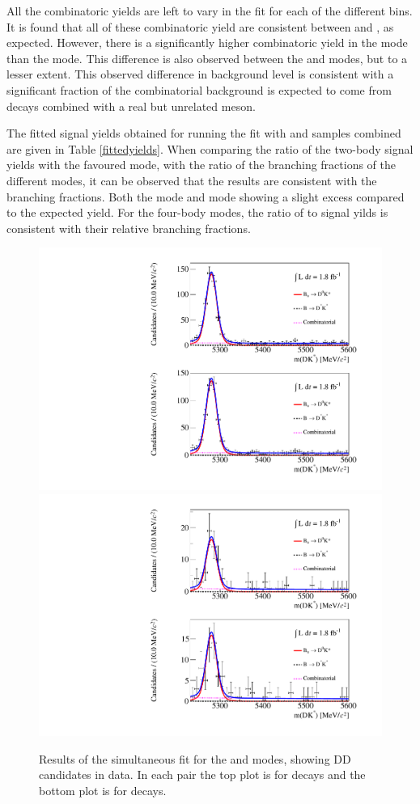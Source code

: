 All the combinatoric yields are left to vary in the \CP fit for each of the different bins. It is found that all of these combinatoric yield are consistent between \Bm and \Bp, as expected. However, there is a significantly higher combinatoric yield in the \kpi mode than the \pik mode. This difference is also observed between the \kpipipi and \pikpipi modes, but to a lesser extent. This observed difference in background level is consistent with a significant fraction of the combinatorial background is expected to come from  decays combined with a real but unrelated \KS meson. 

The fitted signal yields obtained for running the fit with \Bp and \Bm samples combined are given in Table \ref{fittedyields}. When comparing the ratio of the two-body signal yields with the favoured mode, with the ratio of the branching fractions of the different \Dz modes, it can be observed that the results are consistent with the branching fractions. Both the \kk mode and \pik mode showing a slight excess compared to the expected yield. For the four-body modes, the ratio of \kpipipi to \pipipipi signal yilds is consistent with their relative branching fractions.

\begin{figure}
\includegraphics[width=0.5\linewidth]{figures/results/canvas_d2kpi_DD_run2.pdf}
\includegraphics[width=0.5\linewidth]{figures/results/canvas_d2kk_DD_run2.pdf}
\caption{Results of the simultaneous fit for the \kpi and \kk modes, showing DD candidates in \runtwo data. In each pair the top plot is for \Bp decays and the bottom plot is for \Bm decays.}
\label{resultskpi}
\end{figure}

